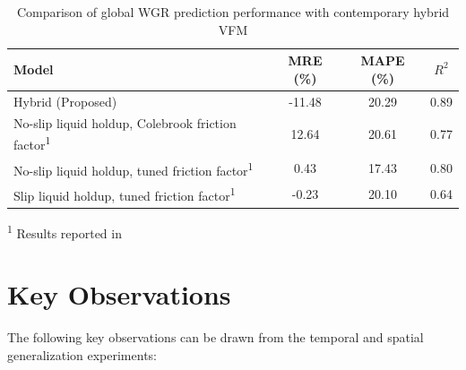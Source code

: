 \documentclass[12pt,APA]{uomthesis}
\begin{document}
\begin{table}[!ht]
\centering
\caption{Comparison of global WGR prediction performance with contemporary hybrid VFM}
\label{tab:wgr_comparison}
\begin{tabular}{lccc}
\hline
Model & MRE (\%) & MAPE (\%) & $R^2$ \\
\hline
Hybrid (Proposed) & -11.48 & 20.29 & 0.89 \\
\hline
No-slip liquid holdup, Colebrook friction factor\textsuperscript{1} & 12.64 & 20.61 & 0.77 \\
No-slip liquid holdup, tuned friction factor\textsuperscript{1} & 0.43 & 17.43 & 0.80 \\
Slip liquid holdup, tuned friction factor\textsuperscript{1} & -0.23 & 20.10 & 0.64 \\
\hline
\end{tabular}

\vspace{0.3em}
\begin{flushleft}
\footnotesize
\textsuperscript{1} Results reported in \citep{nemoto2023cloud} \\
\end{flushleft}
\end{table}

\section{Key Observations}
The following key observations can be drawn from the temporal and spatial generalization experiments:
\end{document}
